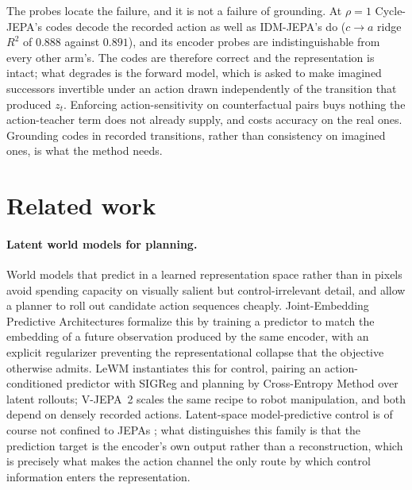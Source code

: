 \documentclass{article}
\begin{document}
The probes locate the failure, and it is not a failure of grounding. At
$\rho = 1$ Cycle-JEPA's codes decode the recorded action as well as
IDM-JEPA's do ($c \to a$ ridge $R^2$ of $0.888$ against $0.891$), and its
encoder probes are indistinguishable from every other arm's. The codes are
therefore correct and the representation is intact; what degrades is the
forward model, which is asked to make imagined successors invertible under an
action drawn independently of the transition that produced $z_t$. Enforcing
action-sensitivity on counterfactual pairs buys nothing the action-teacher term
does not already supply, and costs accuracy on the real ones. Grounding codes
in recorded transitions, rather than consistency on imagined ones, is what the
method needs.

\section{Related work}
\label{sec:related}

\paragraph{Latent world models for planning.}
World models that predict in a learned representation space rather than in pixels
avoid spending capacity on visually salient but control-irrelevant detail, and allow
a planner to roll out candidate action sequences cheaply. Joint-Embedding Predictive
Architectures \citep{lecun2022path, assran2023ijepa, bardes2024vjepa} formalize
this by training a predictor to match the
embedding of a future observation produced by the same encoder, with an explicit
regularizer preventing the representational collapse that the objective otherwise
admits. LeWM \citep{sobal2025lewm} instantiates this for control, pairing an
action-conditioned predictor with SIGReg and planning by Cross-Entropy Method over
latent rollouts; V-JEPA~2 \citep{assran2025vjepa2} scales the same recipe to
robot manipulation, and both depend on densely recorded actions. Latent-space
model-predictive control is of course not confined to JEPAs
\citep{hafner2021dreamerv2, hansen2024tdmpc2}; what distinguishes this family is
that the prediction target is the encoder's own output rather than a
reconstruction, which is precisely what makes the action channel the only route
by which control information enters the representation.
\end{document}
